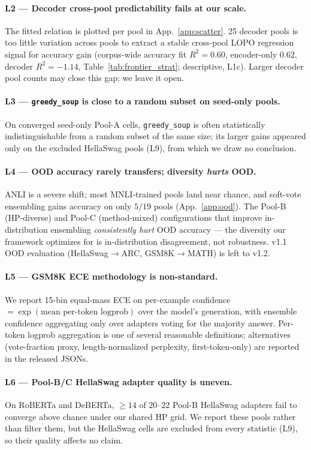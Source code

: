 \documentclass[11pt]{article}
\begin{document}
\paragraph{L2 — Decoder cross-pool predictability fails at our scale.} The fitted relation is plotted per pool in App.~\ref{app:scatter}. 25 decoder pools is too little variation across pools to extract a stable cross-pool LOPO regression signal for accuracy gain (corpus-wide accuracy fit $R^2{=}0.60$, encoder-only $0.62$, decoder $R^2{=}{-}1.14$, Table~\ref{tab:frontier_strat}; descriptive, L1c). Larger decoder pool counts may close this gap; we leave it open.

\paragraph{L3 — \texttt{greedy\_soup} is close to a random subset on seed-only pools.} On converged seed-only Pool-A cells, \texttt{greedy\_soup} is often statistically indistinguishable from a random subset of the same size; its larger gains appeared only on the excluded HellaSwag pools (L9), from which we draw no conclusion.

\paragraph{L4 — OOD accuracy rarely transfers; diversity \emph{hurts} OOD.} ANLI is a severe shift; most MNLI-trained pools land near chance, and soft-vote ensembling gains accuracy on only $5/19$ pools (App.~\ref{app:ood}). The Pool-B (HP-diverse) and Pool-C (method-mixed) configurations that improve in-distribution ensembling \emph{consistently hurt} OOD accuracy --- the diversity our framework optimizes for is in-distribution disagreement, not robustness. v1.1 OOD evaluation (HellaSwag$\to$ARC, GSM8K$\to$MATH) is left to v1.2.

\paragraph{L5 — GSM8K ECE methodology is non-standard.} We report 15-bin equal-mass ECE on per-example confidence $=\!\exp(\text{mean per-token logprob})$ over the model's generation, with ensemble confidence aggregating only over adapters voting for the majority answer. Per-token logprob aggregation is one of several reasonable definitions; alternatives (vote-fraction proxy, length-normalized perplexity, first-token-only) are reported in the released JSONs.

\paragraph{L6 — Pool-B/C HellaSwag adapter quality is uneven.} On RoBERTa and DeBERTa, $\geq 14$ of $20$--$22$ Pool-B HellaSwag adapters fail to converge above chance under our shared HP grid. We report these pools rather than filter them, but the HellaSwag cells are excluded from every statistic (L9), so their quality affects no claim.
\end{document}
